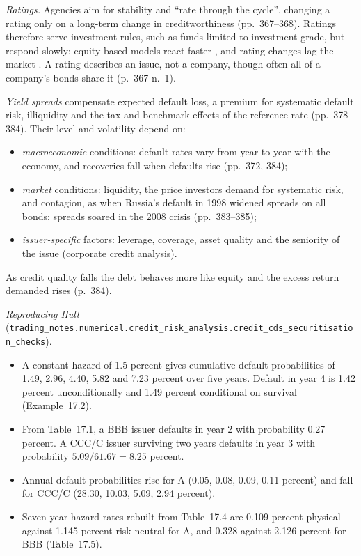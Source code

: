 \begin{qfdefinition}
\emph{Ratings.} Agencies aim for stability and ``rate through the cycle'', changing a rating only on a long-term change in creditworthiness (pp.~367--368). Ratings therefore serve investment rules, such as funds limited to investment grade, but respond slowly; equity-based models react faster \citep[p.~368]{risk-management-financial-institutions-2023}, and rating changes lag the market \citep[p.~568]{financial-statement-analysis-2009}. A rating describes an issue, not a company, though often all of a company's bonds share it (p.~367 n.~1).

\emph{Yield spreads} compensate expected default loss, a premium for systematic default risk, illiquidity and the tax and benchmark effects of the reference rate (pp.~378--384). Their level and volatility depend on:
\begin{itemize}
\item \emph{macroeconomic} conditions: default rates vary from year to year with the economy, and recoveries fall when defaults rise (pp.~372, 384);
\item \emph{market} conditions: liquidity, the price investors demand for systematic risk, and contagion, as when Russia's default in 1998 widened spreads on all bonds; spreads soared in the 2008 crisis (pp.~383--385);
\item \emph{issuer-specific} factors: leverage, coverage, asset quality and the seniority of the issue (\hyperref[meth:corporate-credit-analysis]{corporate credit analysis}).
\end{itemize}
As credit quality falls the debt behaves more like equity and the excess return demanded rises (p.~384).

 \emph{Reproducing Hull} (\nolinkurl{trading_notes.numerical.credit_risk_analysis.credit_cds_securitisation_checks}).
\begin{itemize}
\item A constant hazard of 1.5 percent gives cumulative default probabilities of 1.49, 2.96, 4.40, 5.82 and 7.23 percent over five years. Default in year 4 is 1.42 percent unconditionally and 1.49 percent conditional on survival (Example~17.2).
\item From Table~17.1, a BBB issuer defaults in year 2 with probability 0.27 percent. A CCC/C issuer surviving two years defaults in year 3 with probability $5.09/61.67=8.25$ percent.
\item Annual default probabilities rise for A (0.05, 0.08, 0.09, 0.11 percent) and fall for CCC/C (28.30, 10.03, 5.09, 2.94 percent).
\item Seven-year hazard rates rebuilt from Table~17.4 are 0.109 percent physical against 1.145 percent risk-neutral for A, and 0.328 against 2.126 percent for BBB (Table~17.5).
\end{itemize}


\end{qfdefinition}
